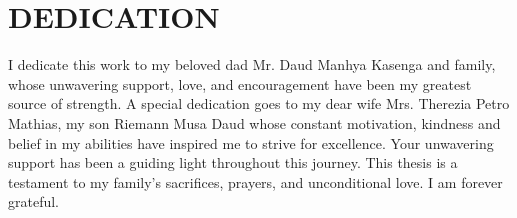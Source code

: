 \documentclass[12pt,a4paper]{report}
\begin{document}
			
		
			
			
			\textbf{\pagebreak{}}
			\section*{\hspace{5cm}DEDICATION}
            I dedicate this work to my beloved dad Mr. Daud Manhya Kasenga and family, whose unwavering support, love, and encouragement have been my greatest source of strength. A special dedication goes to my dear wife Mrs. Therezia Petro Mathias, my son Riemann Musa Daud whose constant motivation, kindness and belief in my abilities have inspired me to strive for excellence. Your unwavering support has been a guiding light throughout this journey. This thesis is a testament to my family's sacrifices, prayers, and unconditional love. I am forever grateful.
   \textbf{\pagebreak{}}
\end{document}
